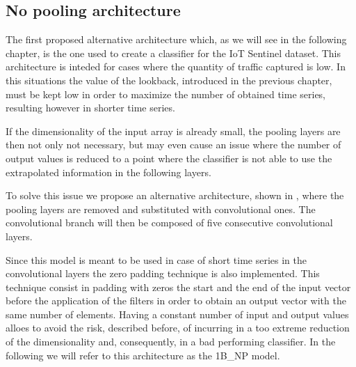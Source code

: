 \subsection{No pooling architecture}\label{npmodels}

The first proposed alternative architecture which, as we will see in the following chapter, is the one used to create a classifier for the IoT Sentinel dataset. This architecture is inteded for cases where the quantity of traffic captured is low. In this situations the value of the lookback, introduced in the previous chapter, must be kept low in order to maximize the number of obtained time series, resulting however in shorter time series. 

If the dimensionality of the input array is already small, the pooling layers are then not only not necessary, but may even cause an issue where the number of output values is reduced to a point where the classifier is not able to use the extrapolated information in the following layers.

To solve this issue we propose an alternative architecture, shown in , where the pooling layers are removed and substituted with convolutional ones. The convolutional branch will then be composed of five consecutive convolutional layers.

Since this model is meant to be used in case of short time series in the convolutional layers the zero padding technique is also implemented. This technique consist in padding with zeros the start and the end of the input vector before the application of the filters in order to obtain an output vector with the same number of elements. Having a constant number of input and output values alloes to avoid the risk, described before, of incurring in a too extreme reduction of the dimensionality and, consequently, in a bad performing classifier.
In the following we will refer to this architecture as the 1B\_NP model. 

